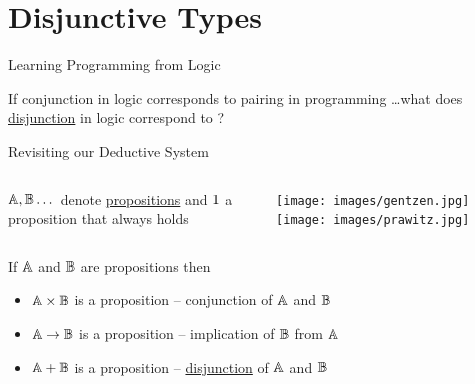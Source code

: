 \documentclass{beamer}
\begin{document}
\section{Disjunctive Types}

\begin{frame}{Learning Programming from Logic}

       If conjunction in logic corresponds to pairing in programming \dots what
       does \alert{\underline{disjunction}} in logic correspond to ?

\end{frame}

\begin{slide}{Revisiting our Deductive System}
  \begin{minipage}[0.3\textheight]{\textwidth}
  \begin{columns}[c]
  \begin{column}{0.5\textwidth}
          $\mathbb{A},\mathbb{B} \dots$ denote \alert{\underline{propositions}}
          and $1$ a proposition that always holds   
  \end{column}
  \begin{column}{0.45\textwidth}
        \texttt{[image: images/gentzen.jpg]}
        \texttt{[image: images/prawitz.jpg]}
  \end{column}
  \end{columns}
  \end{minipage}

  If $\mathbb{A}$ and $\mathbb{B}$ are propositions then
  \begin{itemize}
    \item $\mathbb{A} \times \mathbb{B}$ is a proposition -- 
        conjunction of $\mathbb{A}$ and $\mathbb{B}$
    \item $\mathbb{A} \to \mathbb{B}$ is a proposition -- 
            implication of $\mathbb{B}$ from $\mathbb{A}$
    \item $\mathbb{A} + \mathbb{B}$ is a proposition --
            \alert{\underline{disjunction}} of $\mathbb{A}$ and $\mathbb{B}$
  \end{itemize}
  
\end{slide}
\end{document}
